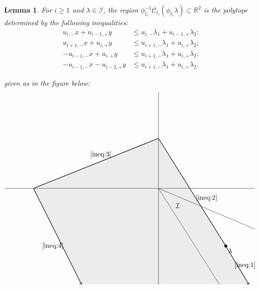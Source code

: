 \documentclass{amsart}
\newtheorem{lemma}[theorem]{Lemma}
\numberwithin{theorem}{section}
\newcommand{\cC}{\mathcal{C}}
\newcommand{\cI}{\mathcal{I}}
\newcommand{\RR}{\mathbb{R}}
\begin{document}
  \begin{lemma}
    For $i\ge1$ and $\lambda\in\cI$, the region $\phi_{t_i}^{-1}\cC_{t_i}(\phi_{t_i}\lambda)\subset\RR^2$ is the polytope determined by the following inequalities:
    \begin{align}
      \label{ineq:1} u_{i,-}x+u_{i-1,+}y &\le u_{i,-}\lambda_1+u_{i-1,+}\lambda_2;\\
      \label{ineq:2} u_{i+1,-}x+u_{i,+}y &\le u_{i+1,-}\lambda_1+u_{i,+}\lambda_2;\\
      \label{ineq:3} -u_{i-1,-}x+u_{i,+}y &\le u_{i+1,-}\lambda_1+u_{i,+}\lambda_2;\\
      \label{ineq:4} -u_{i-1,-}x-u_{i-2,+}y &\le u_{i+1,-}\lambda_1+u_{i,+}\lambda_2.
    \end{align}
    
    given as in the figure below:
    \[
      \begin{tikzpicture}
        \filldraw[color=lightgray!30] (47/10,-5) --(3.5,-3) -- (0,26/10) -- (-26/4,0) -- (-16/4,-5);
        \draw[-] (-8,0) -- (5,0);
        \draw[-] (0,-5) -- (0,5);
        \draw[-] (0,0) -- (5,-2.113);
        \draw[-] (0,0) -- (3.17,-5);
        \node at (1,-0.9) {$\cI$};
        \draw[fill=black] (3.5,-3) circle (2pt);
        \node[below right] at (3.5,-3) {$\lambda$};
        \draw[->,thick] (3.5,-3) -- (47/10,-5);
        \draw[-,thick] (3.5,-3) -- (0,26/10);
        \draw[-,thick] (0,26/10) -- (-26/4,0);
        \draw[->,thick] (-26/4,0) -- (-16/4,-5);
        \node at (4.5,-4) {\eqref{ineq:1}};
        \node at (2.5,-0.5) {\eqref{ineq:2}};
        \node at (-3,1.75) {\eqref{ineq:3}};
        \node at (-5.5,-3) {\eqref{ineq:4}};
      \end{tikzpicture}
    \]
  \end{lemma}
\end{document}
